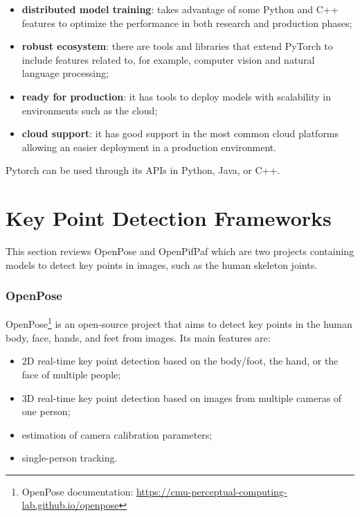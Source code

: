 \begin{itemize}
    \item \textbf{distributed model training}: takes advantage of some Python and C++ features to optimize the performance in both research and production phases;
    \item \textbf{robust ecosystem}: there are tools and libraries that extend PyTorch to include features related to, for example, computer vision and natural language processing;
    \item \textbf{ready for production}: it has tools to deploy models with scalability in environments such as the cloud;
    \item \textbf{cloud support}: it has good support in the most common cloud platforms allowing an easier deployment in a production environment.
\end{itemize}

Pytorch can be used through its APIs in Python, Java, or C++.

\section{Key Point Detection Frameworks}
\label{section:keypointdetection}

This section reviews OpenPose and OpenPifPaf which are two projects containing models to detect key points in images, such as the human skeleton joints.

\subsubsection{OpenPose}

OpenPose\cite{Cao2021,Simon2017,Cao2018,Wei2016}\footnote{OpenPose documentation: \url{https://cmu-perceptual-computing-lab.github.io/openpose}} is an open-source project that aims to detect key points in the human body, face, hands, and feet from images. Its main features are:

\begin{itemize}
    \item 2D real-time key point detection based on the body/foot, the hand, or the face of multiple people;
    \item 3D real-time key point detection based on images from multiple cameras of one person;
    \item estimation of camera calibration parameters;
    \item single-person tracking.
\end{itemize}

